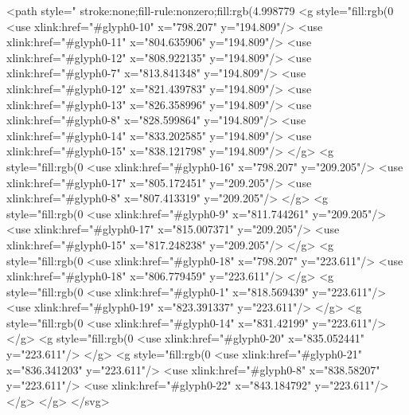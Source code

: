 <path style=" stroke:none;fill-rule:nonzero;fill:rgb(4.998779%
<g style="fill:rgb(0%
  <use xlink:href="#glyph0-10" x="798.207" y="194.809"/>
  <use xlink:href="#glyph0-11" x="804.635906" y="194.809"/>
  <use xlink:href="#glyph0-12" x="808.922135" y="194.809"/>
  <use xlink:href="#glyph0-7" x="813.841348" y="194.809"/>
  <use xlink:href="#glyph0-12" x="821.439783" y="194.809"/>
  <use xlink:href="#glyph0-13" x="826.358996" y="194.809"/>
  <use xlink:href="#glyph0-8" x="828.599864" y="194.809"/>
  <use xlink:href="#glyph0-14" x="833.202585" y="194.809"/>
  <use xlink:href="#glyph0-15" x="838.121798" y="194.809"/>
</g>
<g style="fill:rgb(0%
  <use xlink:href="#glyph0-16" x="798.207" y="209.205"/>
  <use xlink:href="#glyph0-17" x="805.172451" y="209.205"/>
  <use xlink:href="#glyph0-8" x="807.413319" y="209.205"/>
</g>
<g style="fill:rgb(0%
  <use xlink:href="#glyph0-9" x="811.744261" y="209.205"/>
  <use xlink:href="#glyph0-17" x="815.007371" y="209.205"/>
  <use xlink:href="#glyph0-15" x="817.248238" y="209.205"/>
</g>
<g style="fill:rgb(0%
  <use xlink:href="#glyph0-18" x="798.207" y="223.611"/>
  <use xlink:href="#glyph0-18" x="806.779459" y="223.611"/>
</g>
<g style="fill:rgb(0%
  <use xlink:href="#glyph0-1" x="818.569439" y="223.611"/>
  <use xlink:href="#glyph0-19" x="823.391337" y="223.611"/>
</g>
<g style="fill:rgb(0%
  <use xlink:href="#glyph0-14" x="831.42199" y="223.611"/>
</g>
<g style="fill:rgb(0%
  <use xlink:href="#glyph0-20" x="835.052441" y="223.611"/>
</g>
<g style="fill:rgb(0%
  <use xlink:href="#glyph0-21" x="836.341203" y="223.611"/>
  <use xlink:href="#glyph0-8" x="838.58207" y="223.611"/>
  <use xlink:href="#glyph0-22" x="843.184792" y="223.611"/>
</g>
</g>
</svg>
